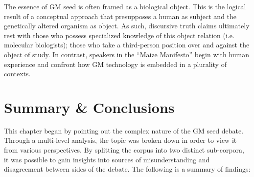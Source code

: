 The essence of GM seed is often framed as a biological object. This is the logical result of a conceptual approach that presupposes a human as subject and the genetically altered organism as object. As such, discursive truth claims ultimately rest with those who possess specialized knowledge of this object relation (i.e. molecular biologists); those who take a third-person position over and against the object of study. In contrast, speakers in the ``Maize Manifesto'' begin with human experience and confront how GM technology is embedded in a plurality of contexts. 

\section{Summary \& Conclusions}

This chapter began by pointing out the complex nature of the GM seed debate. Through a multi-level analysis, the topic was broken down in order to view it from various perspectives. By splitting the corpus into two distinct sub-corpora, it was possible to gain insights into sources of misunderstanding and disagreement between sides of the debate. The following is a summary of findings:

